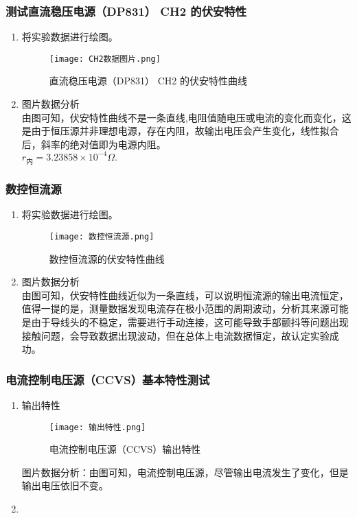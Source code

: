 \documentclass[dvipsnames, svgnames,a4paper,11pt]{article}
\begin{document}
	\subsubsection{测试直流稳压电源（DP831） CH2 的伏安特性}
	\begin{enumerate}
		\item 将实验数据进行绘图。
		\begin{figure}[H]
			\centering
			\texttt{[image: CH2数据图片.png]}
			\caption{直流稳压电源（DP831） CH2 的伏安特性曲线}
			\label{CH2数据图片}
		\end{figure}
		\item 图片数据分析\\
		由图可知，伏安特性曲线不是一条直线,电阻值随电压或电流的变化而变化，这是由于恒压源并非理想电源，存在内阻，故输出电压会产生变化，线性拟合后，斜率的绝对值即为电源内阻。\\
		$r_\text{内}=3.23858\times10^{-4}\Omega.$
		
	\end{enumerate}
		\subsubsection{数控恒流源}
	\begin{enumerate}
		\item 将实验数据进行绘图。
		\begin{figure}[H]
			\centering
			\texttt{[image: 数控恒流源.png]}
			\caption{数控恒流源的伏安特性曲线}
			\label{数控恒流源}
		\end{figure}
		\item 图片数据分析\\
		由图可知，伏安特性曲线近似为一条直线，可以说明恒流源的输出电流恒定，值得一提的是，测量数据发现电流存在极小范围的周期波动，分析其来源可能是由于导线头的不稳定，需要进行手动连接，这可能导致手部颤抖等问题出现接触问题，会导致数据出现波动，但在总体上电流数据恒定，故认定实验成功。
	
	\end{enumerate}
		\subsubsection{电流控制电压源（CCVS）基本特性测试}
	\begin{enumerate}
			\begin{figure}[H]
			\centering
			\texttt{[image: 接线总览.jpg]}
			\caption{实验接线总览}
			\label{接线总览}
		\end{figure}
		\item 输出特性
		
		\begin{figure}[H]
			\centering
			\texttt{[image: 输出特性.png]}
			\caption{电流控制电压源（CCVS）输出特性}
			\label{输出特性}
		\end{figure}
		图片数据分析：由图可知，电流控制电压源，尽管输出电流发生了变化，但是输出电压依旧不变。
		\item 
		
	
	\end{enumerate}
\end{document}
